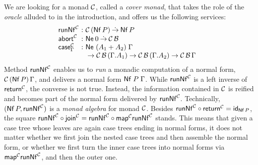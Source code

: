 \documentclass[sigconf,screen,fleqn]{acmart} %
\begin{document}
We are looking for a monad $\C$, called a \emph{cover monad}, that
takes the role of the \emph{oracle} alluded to in the introduction,
and offers us the following services:
\[
\begin{array}{l@{~}c@{~}l@{\quad}l}
\trunNf[\C] & : & \C\,(\tNf\, P) \todot \tNf\, P
\\
\tabort^\C & : & \tNe\, \tyzero \todot \C\,\B
\\
\tcase^\C_\Gamma & : & \Ne {(A_1 + A_2)} \Gamma
\\
  && {} \to \C\,\B\,(\cext \Gamma {A_1})
  \to \C\,\B\,(\cext \Gamma {A_2})
  \to \C\,\B\,\Gamma
\\
\end{array}
\]
Method $\trunNf[\C]$ enables us to \emph{run} a monadic computation of
a normal form, $\C\,(\tNf\,P)\,\Gamma$, and delivers a normal form
$\Nf P \Gamma$.
While $\trunNf[\C]$ is a left inverse of
$\treturn[\C]$, the converse is not true.
Instead, the information contained in $\C$ is reified and
becomes part of the normal form delivered by $\trunNf[\C]$.
Technically, $(\tNf\,P, \trunNf[\C])$ is a
\emph{monad algebra} for monad $\C$.
Besides $\trunNf[\C] \circ \treturn[\C] = \tid_{\tNf\,P}$, the square
$\trunNf[\C] \circ \tjoin[\C] = \trunNf[\C] \circ
 \tmap[\C]\trunNf[\C]$ stands.  This means that given a case tree whose
leaves are again case trees ending in normal forms, it does not
matter whether we first join the nested case trees and then assemble
the normal form, or whether we first turn the inner case trees into
normal forms via $\tmap[\C]\trunNf[\C]$, and then the outer one.
\end{document}
